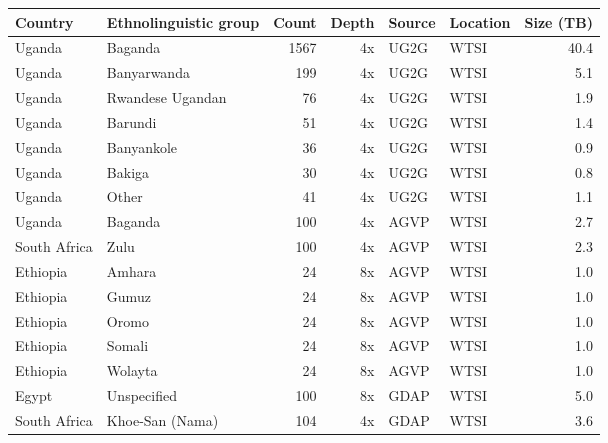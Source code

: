 \begin{table}[ht]
\centering
\begin{tabular}{llrrllr}
\hline
Country & Ethnolinguistic group & Count & Depth & Source & Location & Size (TB) \\
\hline
Uganda & Baganda & 1567 & 4x & UG2G & WTSI & 40.4 \\
Uganda & Banyarwanda & 199 & 4x & UG2G & WTSI & 5.1 \\
Uganda & Rwandese Ugandan & 76 & 4x & UG2G & WTSI & 1.9 \\
Uganda & Barundi & 51 & 4x & UG2G & WTSI & 1.4 \\
Uganda & Banyankole & 36 & 4x & UG2G & WTSI & 0.9 \\
Uganda & Bakiga & 30 & 4x & UG2G & WTSI & 0.8 \\
Uganda & Other & 41 & 4x & UG2G & WTSI & 1.1 \\
Uganda & Baganda & 100 & 4x & AGVP & WTSI & 2.7 \\
South Africa & Zulu & 100 & 4x & AGVP & WTSI & 2.3 \\
Ethiopia & Amhara & 24 & 8x & AGVP & WTSI & 1.0 \\
Ethiopia & Gumuz & 24 & 8x & AGVP & WTSI & 1.0 \\
Ethiopia & Oromo & 24 & 8x & AGVP & WTSI & 1.0 \\
Ethiopia & Somali & 24 & 8x & AGVP & WTSI & 1.0 \\
Ethiopia & Wolayta & 24 & 8x & AGVP & WTSI & 1.0 \\
Egypt & Unspecified & 100 & 8x & GDAP & WTSI & 5.0 \\
South Africa & Khoe-San (Nama) & 104 & 4x & GDAP & WTSI & 3.6 \\

\end{tabular}
\end{table}
